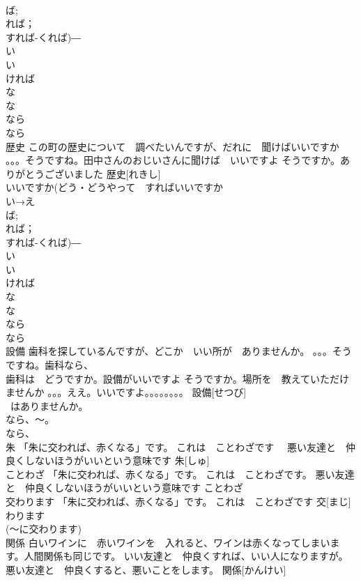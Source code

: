 \documentclass[8pt]{extreport}
\begin{document}
\begin{CJK}{UTF8}{min}
\\	ば;
\\	れば；
\\	すれば-くれば)―　
\\	い
\\	い　
\\	ければ　
\\	な 
\\	な
\\	なら　
\\	なら
\\	歴史	この町の歴史について　調べたいんですが、だれに　聞けばいいですか 。。。そうですね。田中さんのおじいさんに聞けば　いいですよ そうですか。ありがとうございました	歴史[れきし]				
\\	いいですか(どう・どうやって　すればいいですか　
\\	い→え
\\	ば;
\\	れば；
\\	すれば-くれば)―　
\\	い
\\	い　
\\	ければ　
\\	な 
\\	な
\\	なら　
\\	なら
\\	設備	歯科を探しているんですが、どこか　いい所が　ありませんか。 。。。そうですね。歯科なら、
\\	歯科は　どうですか。設備がいいですよ そうですか。場所を　教えていただけませんか 。。。ええ。いいですよ。。。。。。。。	設備[せつび]			
\\	~はありませんか。
\\	なら、～。
\\	なら、
\\	朱	「朱に交われば、赤くなる」です。 これは　ことわざです　 悪い友達と　仲良くしないほうがいいという意味です	朱[しゅ]			
\\	ことわざ	「朱に交われば、赤くなる」です。 これは　ことわざです。 悪い友達と　仲良くしないほうがいいという意味です	ことわざ			
\\	交わります	「朱に交われば、赤くなる」です。 これは　ことわざです	交[まじ]わります			
\\	(～に交わります)		
\\	関係	白いワインに　赤いワインを　入れると、ワインは赤くなってしまいます。人間関係も同じです。 いい友達と　仲良くすれば、いい人になりますが。悪い友達と　仲良くすると、悪いことをします。	関係[かんけい]			

\end{CJK}
\end{document}
